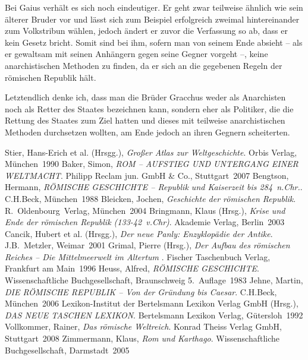 \documentclass[
    12pt,
    smallheadings,
    ]{scrreprt}
\newcommand{\RM}[1]{\MakeUppercase{\romannumeral #1}}
\begin{document}
Bei Gaius verhält es sich noch eindeutiger.
Er geht zwar teilweise ähnlich wie sein älterer Bruder vor und lässt sich zum Beispiel erfolgreich zweimal hintereinander zum Volkstribun wählen, jedoch ändert er zuvor die Verfassung so ab, dass er kein Gesetz bricht.
Somit sind bei ihm, sofern man von seinem Ende absieht -- als er gewaltsam mit seinen Anhängern gegen seine Gegner vorgeht --, keine anarchistischen Methoden zu finden, da er sich an die gegebenen Regeln der römischen Republik hält.

Letztendlich denke ich, dass man die Brüder Gracchus weder als Anarchisten noch als Retter des Staates bezeichnen kann, sondern eher als Politiker, die die Rettung des Staates zum Ziel hatten und dieses mit teilweise anarchistischen Methoden durchsetzen wollten, am Ende jedoch an ihren Gegnern scheiterten.




\begin{thebibliography}{}
 Stier, Hans-Erich et al. (Hrsgg.), \textit{Großer Atlas zur Weltgeschichte}. Orbis Verlag, München~1990
 Baker, Simon, \textit{ROM -- AUFSTIEG UND UNTERGANG EINER WELTMACHT}. Philipp Reclam jun. GmbH \& Co., Stuttgart~2007
 Bengtson, Hermann, \textit{RÖMISCHE GESCHICHTE -- Republik und Kaiserzeit bis 284~n.Chr.}. C.H.Beck, München~1988
 Bleicken, Jochen, \textit{Geschichte der römischen Republik}. R.~Oldenbourg~Verlag, München~2004
 Bringmann, Klaus (Hrsg.), \textit{Krise und Ende der römischen Republik (133-42~v.Chr)}. Akademie Verlag, Berlin~2003
 Cancik, Hubert et al. (Hrsgg.), \textit{Der neue Panly: Enzyklopädie der Antike}. J.B.~Metzler, Weimar~2001
 Grimal, Pierre (Hrsg.), \textit{Der Aufbau des römischen Reiches -- Die Mittelmeerwelt im Altertum \RM{3}}. Fischer Taschenbuch Verlag, Frankfurt am Main~1996
 Heuss, Alfred, \textit{RÖMISCHE GESCHICHTE}. Wissenschaftliche Buchgesellschaft, Braunschweig 5.~Auflage~1983
 Jehne, Martin, \textit{DIE RÖMISCHE REPUBLIK -- Von der Gründung bis Caesar}. C.H.Beck, München~2006
 Lexikon-Institut der Bertelsmann Lexikon Verlag GmbH (Hrsg.), \textit{DAS NEUE TASCHEN LEXIKON}. Bertelsmann Lexikon Verlag, Gütersloh~1992
 Vollkommer, Rainer, \textit{Das römische Weltreich}. Konrad Theiss Verlag GmbH, Stuttgart~2008
 Zimmermann, Klaus, \textit{Rom und Karthago}. Wissenschaftliche Buchgesellschaft, Darmstadt~2005
 
\end{thebibliography}
\end{document}
